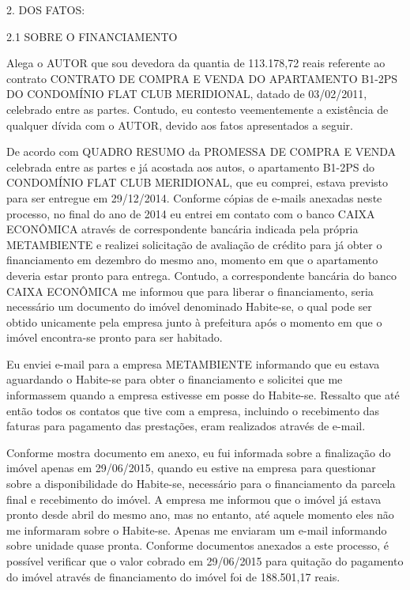 \documentclass[11pt]{letter}
\begin{document}
2. DOS FATOS:

2.1 SOBRE O FINANCIAMENTO

Alega o AUTOR que sou devedora da quantia de 113.178,72 reais referente ao contrato CONTRATO DE COMPRA E VENDA DO APARTAMENTO B1-2PS DO CONDOMÍNIO FLAT CLUB MERIDIONAL, datado de 03/02/2011, celebrado entre as partes. Contudo, eu contesto veementemente a existência de qualquer dívida com o AUTOR, devido aos fatos apresentados a seguir.

De acordo com QUADRO RESUMO da PROMESSA DE COMPRA E VENDA celebrada entre as partes e já acostada aos autos, o apartamento B1-2PS do CONDOMÍNIO FLAT CLUB MERIDIONAL, que eu comprei, estava previsto para ser entregue em 29/12/2014. Conforme cópias de e-mails anexadas neste processo, no final do ano de 2014 eu entrei em contato com o banco CAIXA ECONÔMICA através de correspondente bancária indicada pela própria METAMBIENTE e realizei solicitação de avaliação de crédito para já obter o financiamento em dezembro do mesmo ano, momento em que o apartamento deveria estar pronto para entrega. Contudo, a correspondente bancária do banco CAIXA ECONÔMICA me informou que para liberar o financiamento, seria necessário um documento do imóvel denominado Habite-se, o qual pode ser obtido unicamente pela empresa junto à prefeitura após o momento em que o imóvel encontra-se pronto para ser habitado.

Eu enviei e-mail para a empresa METAMBIENTE informando que eu estava aguardando o Habite-se para obter o financiamento e solicitei que me informassem quando a empresa estivesse em posse do Habite-se. Ressalto que até então todos os contatos que tive com a empresa, incluindo o recebimento das faturas para pagamento das prestações, eram realizados através de e-mail.

Conforme mostra documento em anexo, eu fui informada sobre a finalização do imóvel apenas em 29/06/2015, quando eu estive na empresa para questionar sobre a disponibilidade do Habite-se, necessário para o financiamento da parcela final e recebimento do imóvel. A empresa me informou que o imóvel já estava pronto desde abril do mesmo ano, mas no entanto, até aquele momento eles não me informaram sobre o Habite-se. Apenas me enviaram um e-mail informando sobre unidade quase pronta. Conforme documentos anexados a este processo, é possível verificar que o valor cobrado em 29/06/2015 para quitação do pagamento do imóvel através de financiamento do imóvel foi de 188.501,17 reais.
\end{document}
